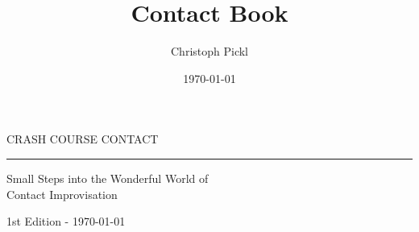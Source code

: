 \documentclass[a5paper,11pt]{book}
\title{Contact Book}
\date{\today}
\author{Christoph Pickl}
\begin{document}
\begin{titlepage}
\begin{center}
	
	\vspace*{\fill}
	
	\fontsize{22}{0}\selectfont
	CRASH COURSE CONTACT
	\vskip 5mm
	\rule{90mm}{0.4pt}
	\vskip 0mm
	\fontsize{15}{20}\selectfont
	Small Steps into the Wonderful World of \\ Contact Improvisation
	
	\vskip 70mm
	
	\vspace*{\fill}

	\fontsize{10}{0}\selectfont
	1st Edition - \today
\end{center}
\end{titlepage}

\pagestyle{empty}
\tableofcontents
\clearpage
\ifodd\value{page}\else
  \thispagestyle{empty}
\fi

\pagestyle{fancy}

















\printglossaries
\end{document}
